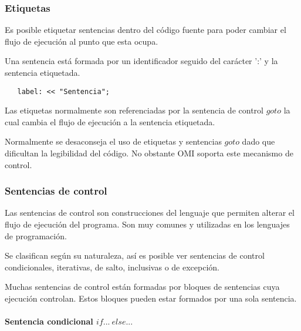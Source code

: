 \subsubsection{Etiquetas} \label{sec:label}
Es posible etiquetar sentencias dentro del código fuente para poder cambiar el flujo de ejecución al punto que esta ocupa.

Una sentencia está formada por un identificador seguido del carácter ':' y la sentencia etiquetada.

\begin{lstlisting}
   label: << "Sentencia";
\end{lstlisting}

Las etiquetas normalmente son referenciadas por la sentencia de control $goto$ la cual cambia el flujo de ejecución 
a la sentencia etiquetada. 

Normalmente se desaconseja el uso de etiquetas y sentencias $goto$ dado que dificultan la legibilidad del código. No obstante OMI 
soporta este mecanismo de control.




\subsubsection{Sentencias de control}

Las sentencias de control son construcciones del lenguaje que permiten alterar el flujo de ejecución del programa. Son muy comunes y
utilizadas en los lenguajes de programación.

Se clasifican según su naturaleza, así es posible ver sentencias de control condicionales, iterativas, de salto, inclusivas o de excepción.

Muchas sentencias de control están formadas por bloques de sentencias cuya ejecución controlan. Estos bloques pueden estar formados por una sola sentencia.



\paragraph{Sentencia condicional $if...\ else...$}\label{sec:stmt_if}

